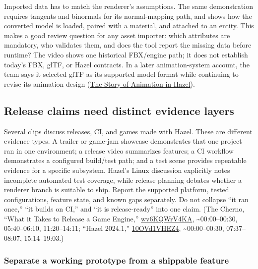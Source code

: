 Imported data has to match the renderer's assumptions. The same demonstration requires tangents and binormals for its normal-mapping path, and shows how the converted model is loaded, paired with a material, and attached to an entity. This makes a good review question for any asset importer: which attributes are mandatory, who validates them, and does the tool report the missing data before runtime? The video shows one historical FBX/engine path; it does not establish today's FBX, glTF, or Hazel contracts. In a later animation-system account, the team says it selected glTF as its supported model format while continuing to revise its animation design (\href{https://www.youtube.com/watch?v=HPZo1oFESYQ&t=2m45s}{The Story of Animation in Hazel}).

\subsection{Release claims need distinct evidence layers}\label{06-engine-ii-ch041-release-claims-need-distinct-evidence-layers}

\hypertarget{06-engine-ii-ch041-release-claims-need-distinct-evidence-layers}{}

Several clips discuss releases, CI, and games made with Hazel. These are different evidence types. A trailer or game-jam showcase demonstrates that one project ran in one environment; a release video summarizes features; a CI workflow demonstrates a configured build/test path; and a test scene provides repeatable evidence for a specific subsystem. Hazel's Linux discussion explicitly notes incomplete automated test coverage, while release planning debates whether a renderer branch is suitable to ship. Report the supported platform, tested configurations, feature state, and known gaps separately. Do not collapse ``it ran once,'' ``it builds on CI,'' and ``it is release-ready'' into one claim. (The Cherno, ``What it Takes to Release a Game Engine,'' \href{https://www.youtube.com/watch?v=wv6KQWrV4KA}{wv6KQWrV4KA}, \textasciitilde00:00--00:30, 05:40--06:10, 11:20--14:11; ``Hazel 2024.1,'' \href{https://www.youtube.com/watch?v=10OVd1VHEZ4}{10OVd1VHEZ4}, \textasciitilde00:00--00:30, 07:37--08:07, 15:14--19:03.)

\subsubsection{Separate a working prototype from a shippable feature}\label{06-engine-ii-ch041-separate-a-working-prototype-from-a-shippable-feature}

